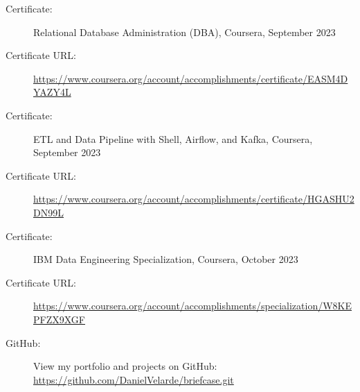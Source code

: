 \documentclass[a4paper,10pt]{article}
\begin{document}
\vspace{1pt} %

\begin{description}
    \item[Certificate:] Relational Database Administration (DBA), Coursera, September 2023
    \item[Certificate URL:] \url{https://www.coursera.org/account/accomplishments/certificate/EASM4DYAZY4L}
\end{description}

\vspace{1pt} %

\begin{description}
    \item[Certificate:] ETL and Data Pipeline with Shell, Airflow, and Kafka, Coursera, September 2023
    \item[Certificate URL:] \url{https://www.coursera.org/account/accomplishments/certificate/HGASHU2DN99L}
\end{description}
\vspace{1pt} %

\begin{description}
    \item[Certificate:] IBM Data Engineering Specialization, Coursera, October 2023
    \item[Certificate URL:] \url{https://www.coursera.org/account/accomplishments/specialization/W8KEPFZX9XGF}
\end{description}
\vspace{1pt} %
\begin{description}
    \item[GitHub:] View my portfolio and projects on GitHub: \url{https://github.com/DanielVelarde/briefcase.git}
\end{description}
\end{document}
